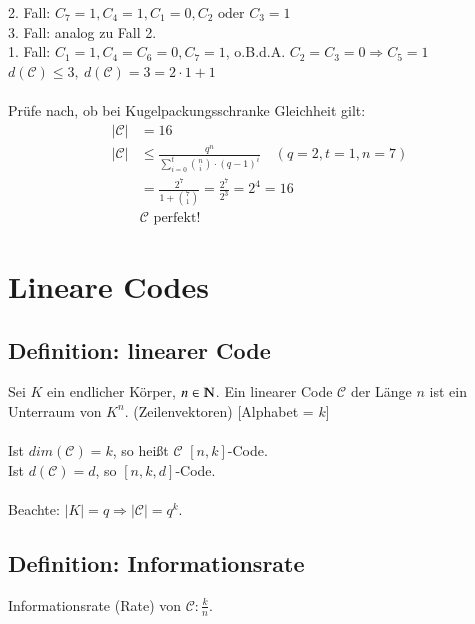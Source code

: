 2. Fall: $C_7=1,C_4=1,C_1=0,C_2 \text{ oder } C_3=1$ \\
3. Fall: analog zu Fall 2.\\
1. Fall: $C_1=1,C_4=C_6=0, C_7=1$, o.B.d.A. $C_2=C_3=0 \Rightarrow C_5=1$\\
$d(\mathcal{C}) \leq 3,\ d(\mathcal{C})=3=2 \cdot 1 + 1$\\
\\
Pr\"ufe nach, ob bei Kugelpackungsschranke Gleichheit gilt:
\begin{align*}
	\left|\mathcal{C}\right| &=16\\
	\left|\mathcal{C}\right| &\leq \frac{q^n}{\sum_{i=0}^t \binom{n}{i} \cdot (q-1)^i} \quad (q=2, t=1, n=7)\\
	&=\frac{2^7}{1+\binom{7}{1}}=\frac{2^7}{2^3}=2^4=16\\
	&\mathcal{C}\text{ perfekt!}
\end{align*}

\section{Lineare Codes}
\subsection{Definition: linearer Code}
Sei $K$ ein endlicher K\"orper, $n \in \N$. Ein linearer Code $\mathcal{C}$ der L\"ange $n$ ist ein Unterraum von $K^n$. (Zeilenvektoren) [Alphabet = $k$] \\
\\
Ist $dim(\mathcal{C})=k$, so hei\ss t $\mathcal{C}$ $\left[n,k\right]$-Code.\\
Ist $d(\mathcal{C})=d$, so $\left[ n,k,d \right]$-Code. \\
\\
Beachte: $\left| K \right| = q \Rightarrow \left| \mathcal{C} \right| =q^k$.\\
\subsection{Definition: Informationsrate}
Informationsrate (Rate) von $\mathcal{C}: \frac{k}{n}$.\\
